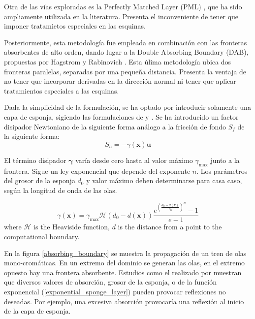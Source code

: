 Otra de las vías exploradas es la Perfectly Matched Layer (PML) \cite{berenger1994}, que ha sido ampliamente utilizada en la literatura. Presenta el inconveniente de tener que imponer tratamietos especiales en las esquinas.

Posteriormente, esta metodología fue empleada en combinación con las fronteras absorbentes de alto orden, dando lugar a la Double Absorbing Boundary (DAB), propuestas por Hagstrom y Rabinovich \cite{hagstrom2014,rabinovich2015}. Esta úlima metodología ubica dos fronteras paralelas, separadas por una pequeña distancia. Presenta la ventaja de no tener que incorporar derivadas en la dirección normal ni tener que aplicar tratamientos especiales a las esquinas.

Dada la simplicidad de la formulación, se ha optado por introducir solamente una capa de esponja, sigiendo las formulaciones de \cite{israeli1981} y \cite{carmigniani2018}. Se ha introducido un factor disipador Newtoniano de la siguiente forma análogo a la fricción de fondo $S_f$ de la siguiente forma:
\begin{equation}
    S_a = -\gamma(\mathbf{x}) \mathbf{u}
\end{equation}


El término disipador $\mathbf{\gamma}$ varía desde cero hasta al valor máximo $\gamma_{\max}$ junto a la frontera. Sigue un ley exponencial \cite{peric2018} que depende del exponente $n$. Los parámetros del grosor de la esponja $d_0$ y valor máximo deben determinarse para casa caso, según la longitud de onda de las olas.

\begin{equation} \label{exponential_sponge_layer}
    \gamma(\mathbf{x}) = \gamma_{\max} \mathcal{H}(d_0 - d(\mathbf{x})) \frac{e^{\left(\frac{d_0 - d(\mathbf{x})}{d_0}\right)^n} - 1}{e - 1}
\end{equation}
where $\mathcal{H}$ is the Heaviside function, $d$ is the distance from a point to the computational boundary.

En la figura \ref{absorbing_boundary} se muestra la propagación de un tren de olas mono-cromáticas. En un extremo del dominio se generan las olas, en el extremo opuesto hay una frontera absorbente. Estudios como el realizado por \cite{carmigniani2018} muestran que diversos valores de absorción, grosor de la esponja, o de la función exponencial (\ref{exponential_sponge_layer}) pueden provocar reflexiones no deseadas. Por ejemplo, una excesiva absorción provocaría una reflexión al inicio de la capa de esponja.

